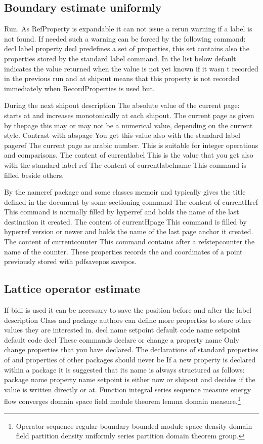 \documentclass{article}
\begin{document}
\subsection{Boundary estimate uniformly}
Run. As RefProperty is expandable it can not issue a rerun warning if a label is not found. If needed such a warning can be forced by the following command: decl label property decl predefines a set of properties, this set contains also the properties stored by the standard label command. In the list below default indicates the value returned when the value is not yet known if it wasn t recorded in the previous run and at shipout means that this property is not recorded immediately when RecordProperties is used but.

During the next shipout description The absolute value of the current page: starts at and increases monotonically at each shipout. The current page as given by thepage this may or may not be a numerical value, depending on the current style. Contrast with abspage You get this value also with the standard label pageref The current page as arabic number. This is suitable for integer operations and comparisons. The content of currentlabel This is the value that you get also with the standard label ref The content of currentlabelname This command is filled beside others.

By the nameref package and some classes memoir and typically gives the title defined in the document by some sectioning command The content of currentHref This command is normally filled by hyperref and holds the name of the last destination it created. The content of currentHpage This command is filled by hyperref version or newer and holds the name of the last page anchor it created. The content of currentcounter This command contains after a refstepcounter the name of the counter. These properties records the and coordinates of a point previously stored with pdfsavepos savepos.

\subsection{Lattice operator estimate}
If bidi is used it can be necessary to save the position before and after the label description Class and package authors can define more properties to store other values they are interested in. decl name setpoint default code name setpoint default code decl These commands declare or change a property name Only change properties that you have declared. The declarations of standard properties of and properties of other packages should never be If a new property is declared within a package it is suggested that its name is always structured as follows: package name property name setpoint is either now or shipout and decides if the value is written directly or at.
Function integral series sequence measure energy flow converges domain space field module theorem lemma domain measure.\footnote{Operator sequence regular boundary bounded module space density domain field partition density uniformly series partition domain theorem group.}
\end{document}
